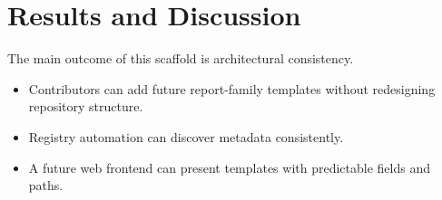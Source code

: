 \chapter{Results and Discussion}

The main outcome of this scaffold is architectural consistency.

\begin{itemize}
  \item Contributors can add future report-family templates without redesigning repository structure.
  \item Registry automation can discover metadata consistently.
  \item A future web frontend can present templates with predictable fields and paths.
\end{itemize}
